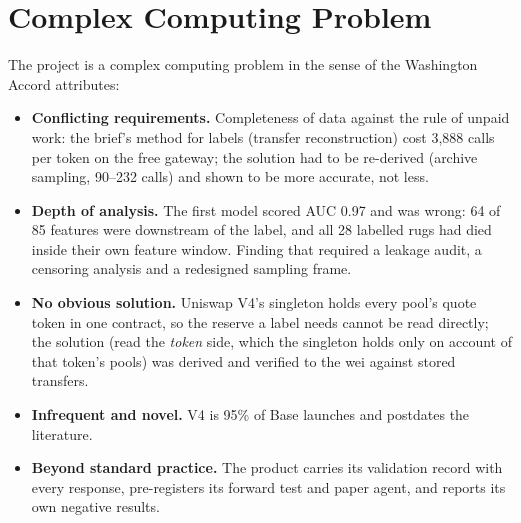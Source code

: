 \section{Complex Computing Problem}
The project is a complex computing problem in the sense of the Washington Accord attributes:
\begin{itemize}
  \item \textbf{Conflicting requirements.} Completeness of data against the rule of unpaid work: the brief's method for labels (transfer reconstruction) cost 3,888 calls per token on the free gateway; the solution had to be re-derived (archive sampling, 90--232 calls) and shown to be more accurate, not less.
  \item \textbf{Depth of analysis.} The first model scored AUC 0.97 and was wrong: 64 of 85 features were downstream of the label, and all 28 labelled rugs had died inside their own feature window. Finding that required a leakage audit, a censoring analysis and a redesigned sampling frame.
  \item \textbf{No obvious solution.} Uniswap V4's singleton holds every pool's quote token in one contract, so the reserve a label needs cannot be read directly; the solution (read the \emph{token} side, which the singleton holds only on account of that token's pools) was derived and verified to the wei against stored transfers.
  \item \textbf{Infrequent and novel.} V4 is 95\% of Base launches and postdates the literature.
  \item \textbf{Beyond standard practice.} The product carries its validation record with every response, pre-registers its forward test and paper agent, and reports its own negative results.
\end{itemize}

